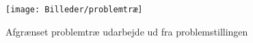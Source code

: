 \documentclass[SRC.tex]{subfiles}
\begin{document}
	\begin{figure}[h!]
		\centering
		\texttt{[image: Billeder/problemtræ]}
		\caption{Afgrænset problemtræ udarbejde ud fra problemstillingen}
		\label{fig:problemtræ}
	\end{figure}	
\end{document}
